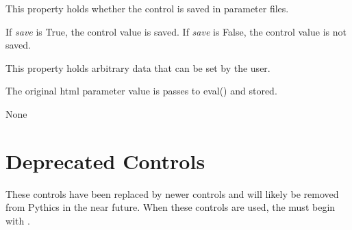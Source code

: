 \documentclass[letterpaper,10pt,english]{sphinxmanual}
\begin{document}
\begin{fulllineitems}
\begin{fulllineitems}
\end{fulllineitems}


\begin{fulllineitems}
\label{api:qwt.Slider.save}
This property holds whether the control is saved in parameter files.

If \emph{save} is True, the control value is saved.
If \emph{save} is False, the control value is not saved.

\end{fulllineitems}


\begin{fulllineitems}
\label{api:qwt.Slider.user}
This property holds arbitrary data that can be set by the user.

The original html parameter value is passes to eval() and stored.

\end{fulllineitems}


\begin{fulllineitems}
\label{api:qwt.Slider.value}
None

\end{fulllineitems}


\end{fulllineitems}



\section{Deprecated Controls}
\label{api:deprecated-controls}
These controls have been replaced by newer controls and will likely be removed
from Pythics in the near future. When these controls are used, the 
must begin with .
\label{api:module-deprecated}
\end{document}
